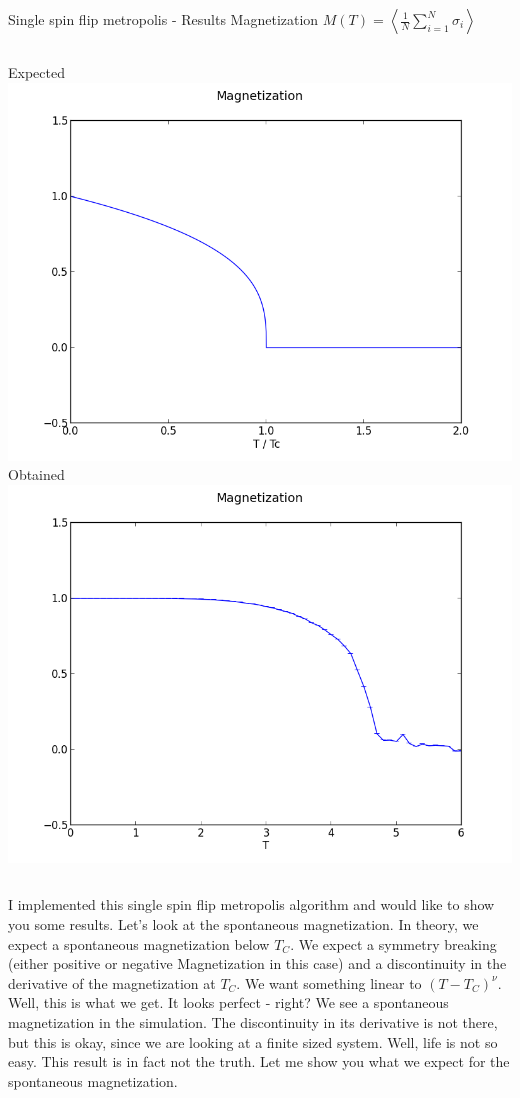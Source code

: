 \documentclass[handout]{beamer}
\begin{document}
\begin{frame}{Single spin flip metropolis - Results}
\pause
Magnetization \( M(T) = \left< \frac{1}{N} \sum\limits_{i=1}^N \sigma_i \right> \)
\begin{columns}[c]
	\pause
	\centering Expected
	\includegraphics[width=\textwidth]{img/single_magnetization_theoretical.png}
	\pause
	\centering Obtained
	\includegraphics[width=\textwidth]{img/single_magnetization_size15.png}
\end{columns}
 {I implemented this single spin flip metropolis algorithm and would like to show you some results.}
 {Let's look at the spontaneous magnetization.}
 {In theory, we expect a spontaneous magnetization below \(T_C\). We expect a symmetry breaking (either positive or negative Magnetization in this case) and a discontinuity in the derivative of the magnetization at \(T_C\). We want something linear to \( (T-T_C)^\nu \).}
 {Well, this is what we get. It looks perfect - right? We see a spontaneous magnetization in the simulation. The discontinuity in its derivative is not there, but this is okay, since we are looking at a finite sized system.
Well, life is not so easy. This result is in fact not the truth. Let me show you what we expect for the spontaneous magnetization.}
\end{frame}
\end{document}
